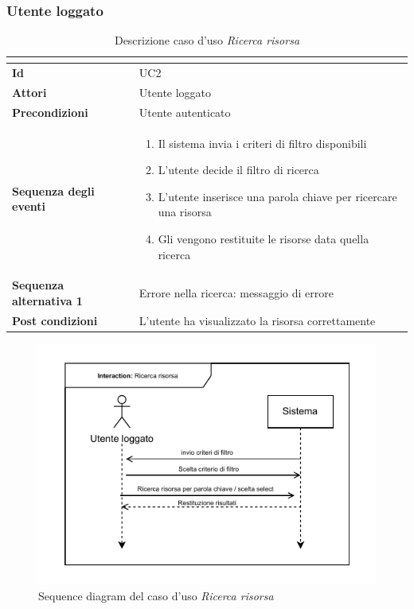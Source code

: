 \documentclass[a4paper]{article}
\begin{document}
\subsubsection{Utente loggato}
\begin{table}[H]
    \centering
    \renewcommand{\arraystretch}{1.5}
    \begin{tabular}{|>{\bfseries}l|p{10cm}|}
        \hline
        \multicolumn{2}{|c|}{\textbf{Caso d'uso: Ricerca risorsa}} \\
        \hline
        \textbf{Id} & UC2 \\ \hline
        \textbf{Attori} & Utente loggato \\ \hline
        \textbf{Precondizioni} & Utente autenticato \\ \hline
        \textbf{Sequenza degli eventi} &
        \begin{enumerate}
            \item Il sistema invia i criteri di filtro disponibili
            \item L'utente decide il filtro di ricerca
            \item L'utente inserisce una parola chiave per ricercare una risorsa
            \item Gli vengono restituite le risorse data quella ricerca
        \end{enumerate}\\ \hline
        \textbf{Sequenza alternativa 1} & Errore nella ricerca: messaggio di errore \\ \hline
        \textbf{Post condizioni} & L'utente ha visualizzato la risorsa correttamente \\ \hline
    \end{tabular}
    \caption{Descrizione caso d'uso \textit{Ricerca risorsa}}
    \label{tab:search_resource-usecase}
\end{table}

\begin{figure}[H]
    \centering
    \includegraphics{./figures/ricerca_risorsa_sd}
    \caption{Sequence diagram del caso d'uso \textit{Ricerca risorsa}}
    \label{fig:sd_ricerca_risorsa}
\end{figure}
\end{document}
